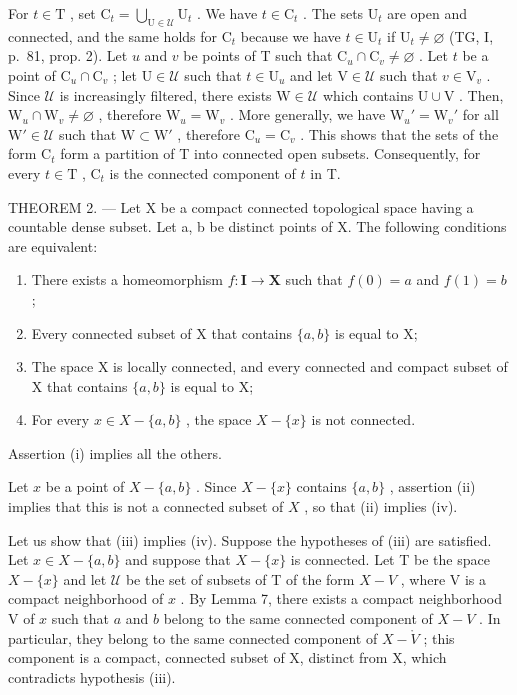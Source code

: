 For \(t \in \mathrm{T}\) , set \(\mathrm{C}_t = \bigcup_{\mathrm{U} \in \mathcal{U}} \mathrm{U}_t\) . We have \(t \in \mathrm{C}_t\) . The sets \(\mathrm{U}_t\) are open and connected, and the same holds for \(\mathrm{C}_t\) because we have \(t \in \mathrm{U}_t\) if \(\mathrm{U}_t \neq \varnothing\) (TG, I, p.~81, prop. 2). Let \(u\) and \(v\) be points of T such that \(\mathrm{C}_u \cap \mathrm{C}_v \neq \varnothing\) . Let \(t\) be a point of \(\mathrm{C}_u \cap \mathrm{C}_v\) ; let \(\mathrm{U} \in \mathcal{U}\) such that \(t \in \mathrm{U}_u\) and let \(\mathrm{V} \in \mathcal{U}\) such that \(v \in \mathrm{V}_v\) . Since \(\mathcal{U}\) is increasingly filtered, there exists \(\mathrm{W} \in \mathcal{U}\) which contains \(\mathrm{U} \cup \mathrm{V}\) . Then, \(\mathrm{W}_u \cap \mathrm{W}_v \neq \varnothing\) , therefore \(\mathrm{W}_u = \mathrm{W}_v\) . More generally, we have \(\mathrm{W}_u' = \mathrm{W}_v'\) for all \(\mathrm{W}' \in \mathcal{U}\) such that \(\mathrm{W} \subset \mathrm{W}'\) , therefore \(\mathrm{C}_u = \mathrm{C}_v\) . This shows that the sets of the form \(\mathrm{C}_t\) form a partition of T into connected open subsets. Consequently, for every \(t \in \mathrm{T}\) , \(\mathrm{C}_t\) is the connected component of \(t\) in T.

THEOREM 2. --- Let X be a compact connected topological space having a countable dense subset. Let a, b be distinct points of X. The following conditions are equivalent:

\begin{enumerate}
\def\labelenumi{(\roman{enumi})}
\item
  There exists a homeomorphism \(f\colon\mathbf{I}\to\mathbf{X}\) such that \(f(0)=a\) and \(f(1)=b\) ;
\item
  Every connected subset of X that contains \(\{a, b\}\) is equal to X;
\item
  The space X is locally connected, and every connected and compact subset of X that contains \(\{a,b\}\) is equal to X;
\item
  For every \(x \in X - \{a, b\}\) , the space \(X - \{x\}\) is not connected.
\end{enumerate}

Assertion (i) implies all the others.

Let \(x\) be a point of \(X - \{a, b\}\) . Since \(X - \{x\}\) contains \(\{a, b\}\) , assertion (ii) implies that this is not a connected subset of \(X\) , so that (ii) implies (iv).

Let us show that (iii) implies (iv). Suppose the hypotheses of (iii) are satisfied. Let \(x \in X - \{a, b\}\) and suppose that \(X - \{x\}\) is connected. Let T be the space \(X - \{x\}\) and let \(\mathcal{U}\) be the set of subsets of T of the form \(X - V\) , where V is a compact neighborhood of \(x\) . By Lemma 7, there exists a compact neighborhood V of \(x\) such that \(a\) and \(b\) belong to the same connected component of \(X - V\) . In particular, they belong to the same connected component of \(X - \mathring{V}\) ; this component is a compact, connected subset of X, distinct from X, which contradicts hypothesis (iii).


